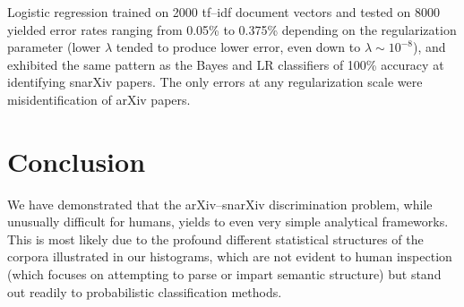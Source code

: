 \documentclass{article}
\begin{document}
Logistic regression trained on 2000 tf--idf document vectors and tested on 8000 yielded error rates ranging from 0.05\% to 0.375\% depending on the regularization parameter (lower $\lambda$ tended to produce lower error, even down to $\lambda \sim 10^{-8}$), and exhibited the same pattern as the Bayes and LR classifiers of 100\% accuracy at identifying snarXiv papers. The only errors at any regularization scale were misidentification of arXiv papers.








\section{Conclusion}
We have demonstrated that the arXiv--snarXiv discrimination problem, while unusually difficult for humans, yields to even very simple analytical frameworks. This is most likely due to the profound different statistical structures of the corpora illustrated in our histograms, which are not evident to human inspection (which focuses on attempting to parse or impart semantic structure) but stand out readily to probabilistic classification methods.
















\end{document}
